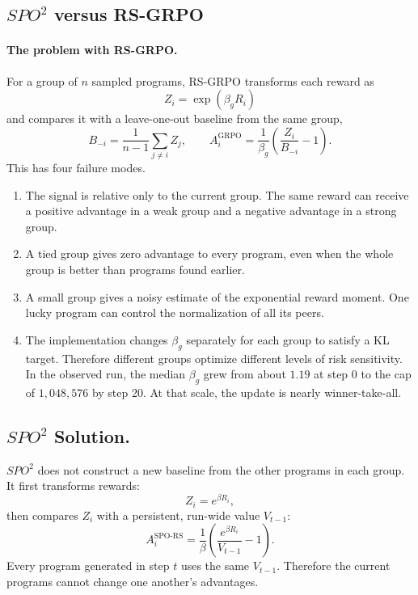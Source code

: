 


\subsection*{$SPO^2$ versus RS-GRPO}

\paragraph{The problem with RS-GRPO.}
For a group of $n$ sampled programs, RS-GRPO transforms each reward as
\[
Z_i=\exp(\beta_g R_i)
\]
and compares it with a leave-one-out baseline from the same group,
\[
B_{-i}=\frac{1}{n-1}\sum_{j\neq i}Z_j,
\qquad
A_i^{\mathrm{GRPO}}
=\frac{1}{\beta_g}\left(\frac{Z_i}{B_{-i}}-1\right).
\]
This has four failure modes.
\begin{enumerate}
    \item The signal is relative only to the current group. The same reward can
    receive a positive advantage in a weak group and a negative advantage in a
    strong group.
    \item A tied group gives zero advantage to every program, even when the
    whole group is better than programs found earlier.
    \item A small group gives a noisy estimate of the exponential reward
    moment. One lucky program can control the normalization of all its peers.
    \item The implementation changes $\beta_g$ separately for each group to
    satisfy a KL target. Therefore different groups optimize different levels
    of risk sensitivity. In the observed run, the median $\beta_g$ grew from
    about $1.19$ at step 0 to the cap of $1{,}048{,}576$ by step 20. At that
    scale, the update is nearly winner-take-all.
\end{enumerate}

\subsection*{$SPO^2$ Solution.}
$SPO^2$ does not construct a new baseline from the other
programs in each group. It first transforms rewards:
\[
Z_i=e^{\beta R_i},
\]
then compares $Z_i$ with a persistent, run-wide value
$V_{t-1}$:
\[
A_i^{\mathrm{SPO\mbox{-}RS}}
=
\frac{1}{\beta}
\left(
\frac{e^{\beta R_i}}{V_{t-1}}-1
\right).
\]
Every program generated in step $t$ uses the same $V_{t-1}$. Therefore the
current programs cannot change one another's advantages.

